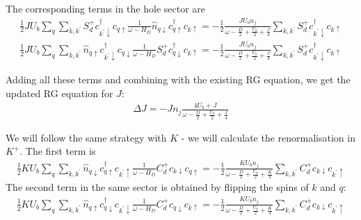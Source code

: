 \documentclass[10pt]{report}
\numberwithin{equation}{section}
\begin{document}
\begin{appendices}
The corresponding terms in the hole sector are
\begin{equation}\begin{aligned}
	\frac{1}{2} J U_b \sum_{q} \sum_{k,k^\prime} S_d^+ c^\dagger_{k^\prime \downarrow} c_{q \uparrow} \frac{1}{\omega - H_D} \hat n_{q \downarrow} c^\dagger_{q \uparrow}c_{k \uparrow} = -\frac{1}{2}\frac{J U_b n_j}{\omega - \frac{D}{2} + \frac{U_b}{2} + \frac{J}{4}} \sum_{k,k^\prime} S_d^+ c^\dagger_{k^\prime \downarrow} c_{k \uparrow}
\end{aligned}\end{equation}
\begin{equation}\begin{aligned}
	\frac{1}{2} J U_b \sum_{q} \sum_{k,k^\prime} \hat n_{q \uparrow} c^\dagger_{k^\prime \downarrow} c_{q \downarrow} \frac{1}{\omega - H_D}S_d^+ c^\dagger_{q \downarrow} c_{k \uparrow} = -\frac{1}{2}\frac{J U_b n_j}{\omega - \frac{D}{2} + \frac{U_b}{2} + \frac{J}{4}} \sum_{k,k^\prime} S_d^+ c^\dagger_{k^\prime \downarrow} c_{k \uparrow}
\end{aligned}\end{equation}

Adding all these terms and combining with the existing RG equation, we get the updated RG equation for \(J\):
\begin{equation}\begin{aligned}
	\Delta J = -J n_j\frac{4 U_b + J}{\omega - \frac{D}{2} + \frac{U_b}{2} + \frac{J}{4}}
\end{aligned}\end{equation}

We will follow the same strategy with \(K\) - we will calculate the renormalisation in \(K^+\). The first term is
\begin{equation}\begin{aligned}
	\frac{1}{2} K U_b \sum_{q} \sum_{k,k^\prime} \hat n_{q \downarrow} c^\dagger_{q \uparrow}c_{k^\prime \uparrow} \frac{1}{\omega - H_D} C_d^+ c_{k \downarrow} c_{q \uparrow} = -\frac{1}{2}\frac{K U_b n_j}{\omega - \frac{D}{2} + \frac{U_b}{2} + \frac{K}{4}} \sum_{k,k^\prime} C_d^+ c_{k \downarrow} c_{k^\prime \uparrow}
\end{aligned}\end{equation}
The second term in the same sector is obtained by flipping the spins of \(k\) and \(q\):
\begin{equation}\begin{aligned}
	\frac{1}{2} K U_b \sum_{q} \sum_{k,k^\prime} \hat n_{q \uparrow} c^\dagger_{q \downarrow}c_{k^\prime \downarrow} \frac{1}{\omega - H_D} C_d^+ c_{q \downarrow} c_{k \uparrow} = -\frac{1}{2}\frac{K U_b n_j}{\omega - \frac{D}{2} + \frac{U_b}{2} + \frac{K}{4}} \sum_{k,k^\prime} C_d^+ c_{k \downarrow} c_{k^\prime \uparrow}
\end{aligned}\end{equation}


\end{appendices}
\end{document}
